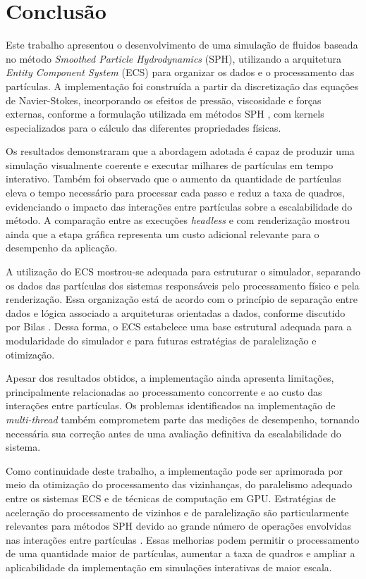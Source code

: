 \section{Conclusão}
\label{sec:conclusao}


Este trabalho apresentou o desenvolvimento de uma simulação de fluidos baseada
no método \textit{Smoothed Particle Hydrodynamics} (SPH), utilizando a
arquitetura \textit{Entity Component System} (ECS) para organizar os dados e o
processamento das partículas. A implementação foi construída a partir da
discretização das equações de Navier-Stokes, incorporando os efeitos de
pressão, viscosidade e forças externas, conforme a formulação utilizada em
métodos SPH \cite{monaghan2005,muller2003particle}, com kernels especializados
para o cálculo das diferentes propriedades físicas.

Os resultados demonstraram que a abordagem adotada é capaz de produzir uma
simulação visualmente coerente e executar milhares de partículas em tempo
interativo. Também foi observado que o aumento da quantidade de partículas
eleva o tempo necessário para processar cada passo e reduz a taxa de quadros,
evidenciando o impacto das interações entre partículas sobre a escalabilidade
do método. A comparação entre as execuções \textit{headless} e com renderização
  mostrou ainda que a etapa gráfica representa um custo adicional relevante
  para o desempenho da aplicação.

A utilização do ECS mostrou-se adequada para estruturar o simulador, separando
os dados das partículas dos sistemas responsáveis pelo processamento físico e
pela renderização. Essa organização está de acordo com o princípio de separação
entre dados e lógica associado a arquiteturas orientadas a dados, conforme
discutido por Bilas \cite{bilas2002}. Dessa forma, o ECS estabelece uma base
estrutural adequada para a modularidade do simulador e para futuras estratégias
de paralelização e otimização.

Apesar dos resultados obtidos, a implementação ainda apresenta limitações,
principalmente relacionadas ao processamento concorrente e ao custo das
interações entre partículas. Os problemas identificados na implementação de
\textit{multi-thread} também comprometem parte das medições de desempenho,
tornando necessária sua correção antes de uma avaliação definitiva da
escalabilidade do sistema.

Como continuidade deste trabalho, a implementação pode ser aprimorada por meio
da otimização do processamento das vizinhanças, do paralelismo adequado entre
os sistemas ECS e de técnicas de computação em GPU. Estratégias de aceleração
do processamento de vizinhos e de paralelização são particularmente relevantes
para métodos SPH devido ao grande número de operações envolvidas nas interações
entre partículas \cite{koschier2020sph}. Essas melhorias podem permitir o
processamento de uma quantidade maior de partículas, aumentar a taxa de quadros
e ampliar a aplicabilidade da implementação em simulações interativas de maior
escala.
